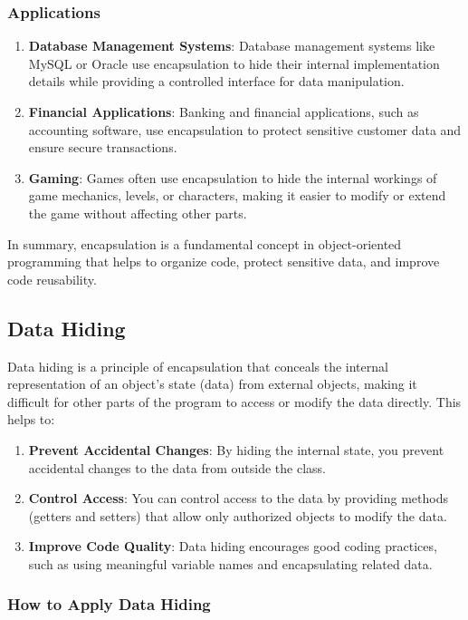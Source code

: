 \documentclass{book}
\begin{document}
\subsubsection{Applications}

\begin{enumerate}
	\item \textbf{Database Management Systems}: Database management systems like MySQL or Oracle use encapsulation to hide their internal implementation details while providing a controlled interface for data manipulation.
	\item \textbf{Financial Applications}: Banking and financial applications, such as accounting software, use encapsulation to protect sensitive customer data and ensure secure transactions.
	\item \textbf{Gaming}: Games often use encapsulation to hide the internal workings of game mechanics, levels, or characters, making it easier to modify or extend the game without affecting other parts.
\end{enumerate}

In summary, encapsulation is a fundamental concept in object-oriented programming that helps to organize code, protect sensitive data, and improve code reusability.
\subsection{Data Hiding}
Data hiding is a principle of encapsulation that conceals the internal representation of an object's state (data) from external objects, making it difficult for other parts of the program to access or modify the data directly. This helps to:

\begin{enumerate}
	\item \textbf{Prevent Accidental Changes}: By hiding the internal state, you prevent accidental changes to the data from outside the class.
	\item \textbf{Control Access}: You can control access to the data by providing methods (getters and setters) that allow only authorized objects to modify the data.
	\item \textbf{Improve Code Quality}: Data hiding encourages good coding practices, such as using meaningful variable names and encapsulating related data.
\end{enumerate}

\subsubsection{How to Apply Data Hiding}
\end{document}
